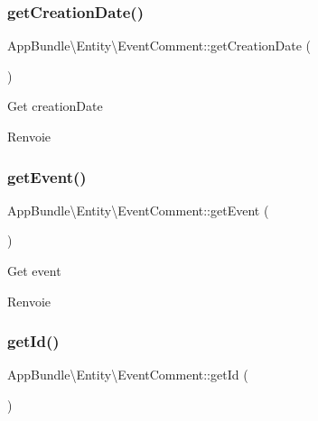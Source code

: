 \subsubsection{\texorpdfstring{get\+Creation\+Date()}{getCreationDate()}}
{\footnotesize\ttfamily App\+Bundle\textbackslash{}\+Entity\textbackslash{}\+Event\+Comment\+::get\+Creation\+Date (\begin{DoxyParamCaption}{ }\end{DoxyParamCaption})}

Get creation\+Date

\begin{DoxyReturn}{Renvoie}

\end{DoxyReturn}
\mbox{\label{classAppBundle_1_1Entity_1_1EventComment_a669d14ee74682b5fbb3aa9df1ec492a2}} 
\subsubsection{\texorpdfstring{get\+Event()}{getEvent()}}
{\footnotesize\ttfamily App\+Bundle\textbackslash{}\+Entity\textbackslash{}\+Event\+Comment\+::get\+Event (\begin{DoxyParamCaption}{ }\end{DoxyParamCaption})}

Get event

\begin{DoxyReturn}{Renvoie}

\end{DoxyReturn}
\mbox{\label{classAppBundle_1_1Entity_1_1EventComment_aa6782b6b3e4d8d79a0078f081dce8f77}} 
\subsubsection{\texorpdfstring{get\+Id()}{getId()}}
{\footnotesize\ttfamily App\+Bundle\textbackslash{}\+Entity\textbackslash{}\+Event\+Comment\+::get\+Id (\begin{DoxyParamCaption}{ }\end{DoxyParamCaption})}

